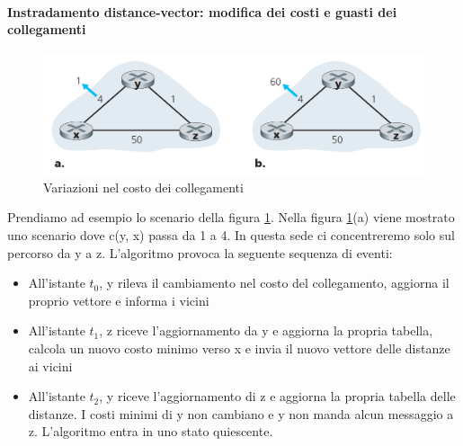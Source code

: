 \documentclass[11pt,a4paper]{article}
\begin{document}
\paragraph{Instradamento distance-vector: modifica dei costi e guasti dei collegamenti}
\begin{figure}
	\includegraphics[scale=0.5]{img/065.png}
	\caption{Variazioni nel costo dei collegamenti}
	\label{fig: 065}
\end{figure}
Prendiamo ad esempio lo scenario della figura \ref{fig: 065}. Nella figura \ref{fig: 065}(a) viene mostrato uno scenario dove c(y, x) passa da 1 a 4. In questa sede ci concentreremo solo sul percorso da y a z. L'algoritmo provoca la seguente sequenza di eventi:
\begin{itemize}
	\item All'istante $t_{0}$, y rileva il cambiamento nel costo del collegamento, aggiorna il proprio vettore e informa i vicini
	\item All'istante $t_{1}$, z riceve l'aggiornamento da y e aggiorna la propria tabella, calcola un nuovo costo minimo verso x e invia il nuovo vettore delle distanze ai vicini
	\item All'istante $t_{2}$, y riceve l'aggiornamento di z e aggiorna la propria tabella delle distanze. I costi minimi di y non cambiano e y non manda alcun messaggio a z. L'algoritmo entra in uno stato quiescente.
\end{itemize}
\end{document}

